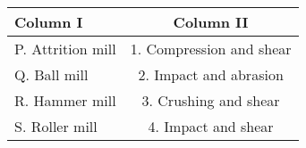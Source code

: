 \begin{center}
\begin{tabular}{|l|c|}
\hline
\textbf{Column I} & \textbf{Column II} \\ \hline
P. Attrition mill & 1. Compression and shear \\ 
Q. Ball mill & 2. Impact and abrasion \\ 
R. Hammer mill & 3. Crushing and shear \\
S. Roller mill & 4. Impact and shear \\ \hline
\end{tabular}
\end{center}